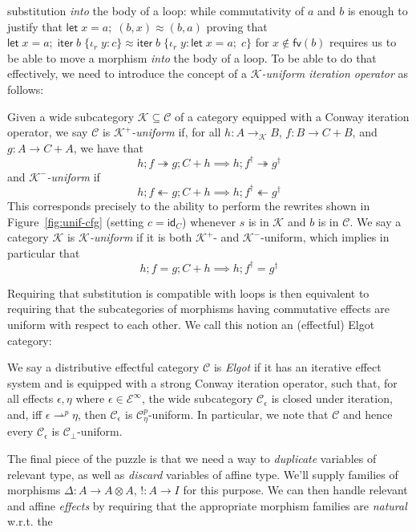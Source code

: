 \documentclass[acmsmall,screen,review]{acmart}
\newcommand{\mc}[1]{\ensuremath{\mathcal{#1}}}
\newcommand{\ms}[1]{\ensuremath{\mathsf{#1}}}
\newcommand{\lto}{:}
\newcommand{\linr}[1]{\iota_r\;{#1}}
\newcommand{\letexpr}[3]{\ensuremath{\ms{let}\;#1 = #2;\;#3}}
\newcommand{\liter}[3]{\ms{iter}\;#1\;\{ \linr{#2} \lto #3 \}}
\newcommand{\cref}{\twoheadrightarrow}
\newcommand{\anticref}{\twoheadleftarrow}
\newcommand{\rightmove}{\rightharpoonup}
\begin{document}
substitution \emph{into} the body of a loop: while commutativity of $a$ and $b$ is enough to justify
that
$
\letexpr{x}{a}{(b, x)} \approx (b, a)
$
proving that
$
\letexpr{x}{a}{\liter{b}{y}{c}} \approx \liter{b}{y}{\letexpr{x}{a}{c}}
$
for $x \notin \ms{fv}(b)$ requires us to be able to move a morphism \emph{into} the body of a loop.
To be able to do that effectively, we need to introduce the concept of a \emph{\mc{K}-uniform
iteration operator} as follows:
\begin{definition}[Uniformity]
  Given a wide subcategory $\mc{K} \subseteq \mc{C}$ of a category equipped with a Conway iteration
  operator, we say $\mc{C}$ is \emph{$\mc{K}^+$-uniform} if, for all $h : A \to_{\mc{K}} B$, $f : B
  \to C + B$, and $g : A \to C + A$, we have that
  $$
  h ; f \cref g ; C + h \implies h ; f^\dagger \cref g^\dagger 
  $$
  and \emph{$\mc{K}^-$-uniform} if
  $$
  h ; f \anticref g ; C + h \implies h ; f^\dagger \anticref g^\dagger 
  $$
  This corresponds precisely to the ability to perform the rewrites shown in
  Figure~\ref{fig:unif-cfg} (setting $c = \ms{id}_C$) whenever $s$ is in $\mc{K}$ and $b$ is in
  $\mc{C}$. We say a category $\mc{K}$ is \emph{$\mc{K}$-uniform} if it is both $\mc{K}^+$- and
  $\mc{K}^-$-uniform, which implies in particular that
  $$
  h ; f = g ; C + h \implies h ; f^\dagger = g^\dagger 
  $$
\end{definition}
Requiring that substitution is compatible with loops is then equivalent to requiring that the
subcategories of morphisms having commutative effects are uniform with respect to each other. We
call this notion an (effectful) Elgot category:
\begin{definition}
  We say a distributive effectful category $\mc{C}$ is \emph{Elgot} if it has an iterative effect
  system and is equipped with a strong Conway iteration operator, such that, for all effects
  $\epsilon, \eta$ where $\epsilon \in \mc{E}^\infty$, the wide subcategory $\mc{C}_\epsilon$ is
  closed under iteration, and, iff $\epsilon \rightmove^p \eta$, then $\mc{C}_\epsilon$ is
  $\mc{C}_\eta^p$-uniform. 
  In particular, we note that $\mc{C}$ and hence every $\mc{C}_\epsilon$ is
  $\mc{C}_\bot$-uniform.
\end{definition}
The final piece of the puzzle is that we need a way to \emph{duplicate} variables of relevant type,
as well as \emph{discard} variables of affine type. We'll supply families of morphisms $\Delta: A
\to A \otimes A$, $!: A \to I$ for this purpose. We can then handle relevant and affine
\emph{effects} by requiring that the appropriate morphism families are \emph{natural} w.r.t. the
\end{document}
